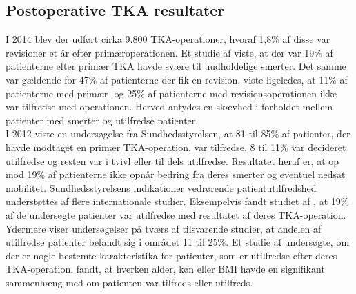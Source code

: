 \subsection{Postoperative TKA resultater}
I 2014 blev der udført cirka 9.800 TKA-operationer, hvoraf 1,8\% af disse var revisioner et år efter primæroperationen. \citep{aarsrapport2016} Et studie af  viste, at der var 19\% af patienterne efter primær TKA havde svære til uudholdelige smerter. Det samme var gældende for 47\% af patienterne der fik en revision.  viste ligeledes, at 11\% af patienterne med primær- og 25\% af patienterne med revisionsoperationen ikke var tilfredse med operationen. \citep{Petersen2015} Herved antydes en skævhed i forholdet mellem patienter med smerter og utilfredse patienter. \\
I 2012 viste en undersøgelse fra Sundhedsstyrelsen, at 81 til 85\% af patienter, der havde modtaget en primær TKA-operation, var tilfredse, 8 til 11\% var decideret utilfredse og resten var i tvivl eller til dels utilfredse. Resultatet heraf er, at op mod 19\% af patienterne ikke opnår bedring fra deres smerter og eventuel nedsat mobilitet. \citep{brostrom2012} Sundhedsstyrelsens indikationer vedrørende patientutilfredshed understøttes af flere internationale studier. Eksempelvis fandt studiet af , at 19\% af de undersøgte patienter var utilfredse med resultatet af deres TKA-operation. Ydermere viser undersøgelser på tværs af tilsvarende studier, at andelen af utilfredse patienter befandt sig i området 11 til 25\%. \citep{Bourne2010} Et studie af  undersøgte, om der er nogle bestemte karakteristika for patienter, som er utilfredse efter deres TKA-operation.  fandt, at hverken alder, køn eller BMI havde en signifikant sammenhæng med om patienten var tilfreds eller utilfreds. 
